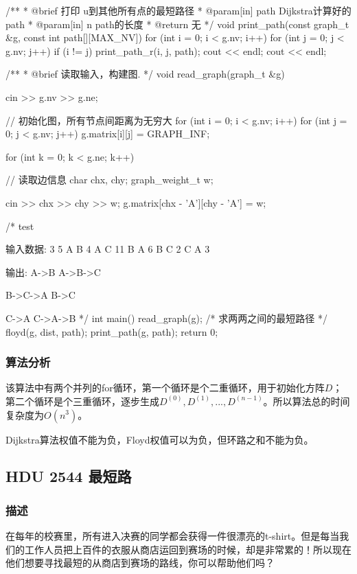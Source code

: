 \begin{Codex}[label=am_graph_floyd.cpp]
/**
 * @brief 打印 u到其他所有点的最短路径
 * @param[in] path Dijkstra计算好的path
 * @param[in] n path的长度
 * @return 无
 */
void print_path(const graph_t &g, const int path[][MAX_NV]) {
    for (int i = 0; i < g.nv; i++) {
        for (int j = 0; j < g.nv; j++) {
            if (i != j) {
                print_path_r(i, j, path);
                cout << endl;
            }
        }
        cout << endl;
    }
}

/**
 * @brief 读取输入，构建图.
 */
void read_graph(graph_t &g) {
    cin >> g.nv >> g.ne;

    // 初始化图，所有节点间距离为无穷大
    for (int i = 0; i < g.nv; i++) {
        for (int j = 0; j < g.nv; j++) {
            g.matrix[i][j] = GRAPH_INF;
        }
    }

    for (int k = 0; k < g.ne; k++) { // 读取边信息
        char chx, chy;
        graph_weight_t w;

        cin >> chx >> chy >> w;
        g.matrix[chx - 'A'][chy - 'A'] = w;
    }
}

/* test

输入数据:
3 5
A B 4
A C 11
B A 6
B C 2
C A 3

输出:
A->B
A->B->C

B->C->A
B->C

C->A
C->A->B
*/
int main() {
    read_graph(g);
    /* 求两两之间的最短路径 */
    floyd(g, dist, path);
    print_path(g, path);
    return 0;
}
\end{Codex}

\subsubsection{算法分析}
该算法中有两个并列的for循环，第一个循环是个二重循环，用于初始化方阵$D$；第二个循环是个三重循环，逐步生成$D^{(0)}, D^{(1)} ,...,D^{(n-1)}$。所以算法总的时间复杂度为$O(n^3)$。

Dijkstra算法权值不能为负，Floyd权值可以为负，但环路之和不能为负。


\subsection{HDU 2544 最短路}
\subsubsection{描述}
在每年的校赛里，所有进入决赛的同学都会获得一件很漂亮的t-shirt。但是每当我们的工作人员把上百件的衣服从商店运回到赛场的时候，却是非常累的！所以现在他们想要寻找最短的从商店到赛场的路线，你可以帮助他们吗？

